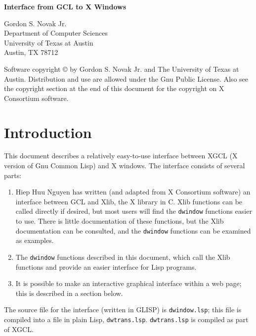 
\setlength{\oddsidemargin}{0 in}
\setlength{\textwidth}{6.5 in}
\setlength{\textheight}{9.0 in}
\setlength{\parskip}{0.1 in}
\setlength{\parindent}{0.0 in}
\setlength{\topmargin}{-0.4in}



\Large
\begin{center} {\bf Interface from GCL to X Windows} \\  \end{center}

\normalsize

\vspace*{0.1in}

\begin{center}
\large{Gordon S. Novak Jr. \\
Department of Computer Sciences \\
University of Texas at Austin \\
Austin, TX  78712} \\
\end{center}

Software copyright \copyright \/ by Gordon S. Novak Jr. and
The University of Texas at Austin.  Distribution and use are allowed
under the Gnu Public License.  Also see the copyright section at the end
of this document for the copyright on X Consortium software.

\vspace*{-0.2in}

\section{Introduction}

This document describes a relatively easy-to-use interface between
XGCL (X version of Gnu Common Lisp) and X windows.  The interface
consists of several parts:
\begin{enumerate}
\item Hiep Huu Nguyen has written (and adapted from X Consortium software)
an interface between GCL and Xlib, the X library in C.
Xlib functions can be called directly if desired, but most users will find
the {\tt dwindow} functions easier to use.  There is little documentation
of these functions, but the Xlib documentation can be consulted, and
the {\tt dwindow} functions can be examined as examples.

\item The {\tt dwindow} functions described in this document, which call
the Xlib functions and provide an easier interface for Lisp programs.

\item It is possible to make an interactive graphical interface
within a web page; this is described in a section below.
\end{enumerate}
The source file for the interface (written in GLISP) is
{\tt dwindow.lsp}; this file is compiled into a file in plain Lisp,
{\tt dwtrans.lsp}.  {\tt dwtrans.lsp} is compiled as part of XGCL.

